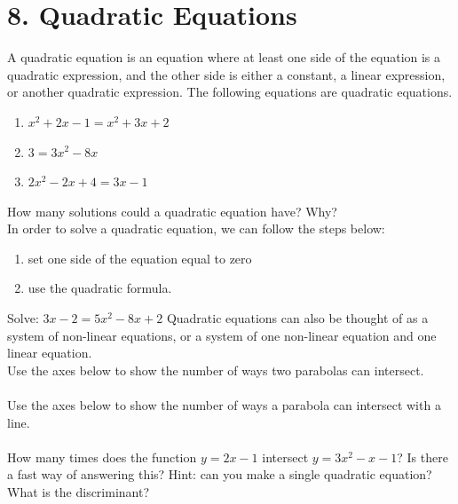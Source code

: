 \documentclass[12pt,fleqn]{book}
\begin{document}
\chapter{8. Quadratic Equations}
A quadratic equation is an equation where at least one side of the equation is a quadratic expression, and the other side is either a constant, a linear expression, or another quadratic expression.  The following equations are quadratic equations.
\begin{enumerate}
	\item $x^2+2x-1=x^2+3x+2$
	\item $3=3x^2-8x$
	\item $2x^2-2x+4=3x-1$
\end{enumerate}
How many solutions could a quadratic equation have?  Why?\\[2in]
In order to solve a quadratic equation, we can follow the steps below:
\begin{enumerate}
	\item set one side of the equation equal to zero
	\item use the quadratic formula.
\end{enumerate}
Solve: $3x-2=5x^2-8x+2$
\clearpage
Quadratic equations can also be thought of as a system of non-linear equations, or a system of one non-linear equation and one linear equation.
\\[1em]
Use the axes below to show the number of ways two parabolas can intersect.\\[1em]
\\[1em]
Use the axes below to show the number of ways a parabola can intersect with a line.
\\[1em]
\\[1em]
How many times does the function $y=2x-1$ intersect $y=3x^2-x-1$?  Is there a fast way of answering this?  Hint: can you make a single quadratic equation?  What is the discriminant?
\end{document}

